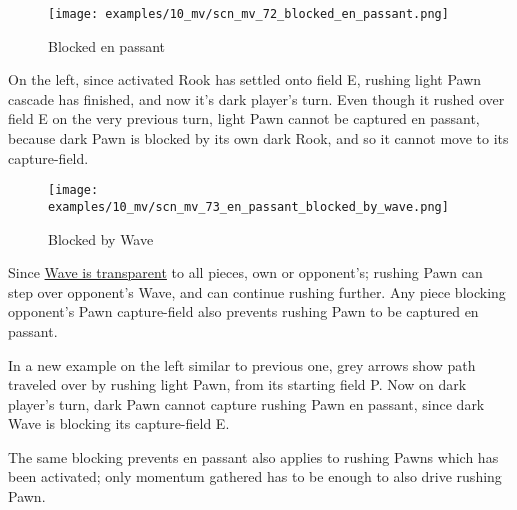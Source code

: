 \clearpage %

\vspace*{-2.1\baselineskip}
\noindent
\begin{wrapfigure}[10]{l}{0.4\textwidth}
\centering
\texttt{[image: examples/10\_mv/scn\_mv\_72\_blocked\_en\_passant.png]}
\vspace*{-1.4\baselineskip}
\caption{Blocked en passant}
\label{fig:scn_mv_72_blocked_en_passant}
\end{wrapfigure}
On the left, since activated Rook has settled onto field E, rushing light Pawn
cascade has finished, and now it's dark player's turn. \newline
\indent
Even though it rushed over field E on the very previous turn, light Pawn cannot
be captured en passant, because dark Pawn is blocked by its own dark Rook, and
so it cannot move to its capture-field.

\vspace*{3.7\baselineskip}
\noindent
\begin{wrapfigure}[13]{l}{0.4\textwidth}
\centering
\texttt{[image: examples/10\_mv/scn\_mv\_73\_en\_passant\_blocked\_by\_wave.png]}
\vspace*{-1.4\baselineskip}
\caption{Blocked by Wave}
\label{fig:scn_mv_73_en_passant_blocked_by_wave}
\end{wrapfigure}
Since \hyperref[fig:scn_mv_07_wave_is_transparent]{Wave is transparent} to all pieces,
own or opponent's; rushing Pawn can step over opponent's Wave, and can continue rushing
further. Any piece blocking opponent's Pawn capture-field also prevents rushing Pawn to
be captured en passant.

In a new example on the left similar to previous one, grey arrows show path traveled
over by rushing light Pawn, from its starting field P. Now on dark player's turn,
dark Pawn cannot capture rushing Pawn en passant, since dark Wave is blocking its
capture-field E.

The same blocking prevents en passant also applies to rushing Pawns which has
been activated; only momentum gathered has to be enough to also drive rushing
Pawn.

\clearpage %

